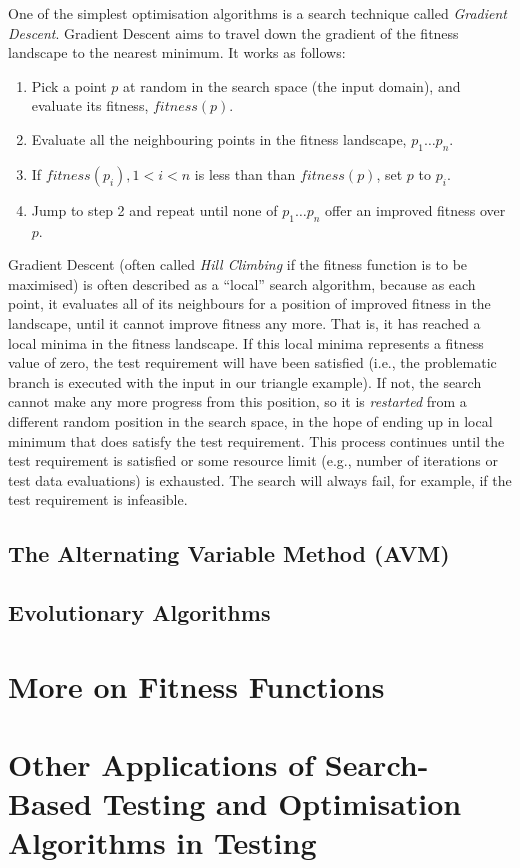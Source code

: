 One of the simplest optimisation algorithms is a search technique called {\it
Gradient Descent}. Gradient Descent aims to travel down the gradient of the
fitness landscape to the nearest minimum. It works as follows:

\begin{enumerate}

\item Pick a point $p$ at random in the search space (the input domain), and evaluate
its fitness, $\mathit{fitness}(p)$.
\item Evaluate all the neighbouring points in the fitness landscape, $p_1 \dots p_n$.
\item If $\mathit{fitness}(p_i), 1 < i < n$ is less than than
$\mathit{fitness}(p)$, set $p$ to $p_i$.
\item Jump to step 2 and repeat until none of $p_1 \dots p_n$ offer an improved
fitness over $p$.

\end{enumerate}

Gradient Descent (often called {\it Hill Climbing} if the fitness function is to
be maximised) is often described as a ``local'' search algorithm, because as
each point, it evaluates all of its neighbours for a position of improved
fitness in the landscape, until it cannot improve fitness any more. That is, it
has reached a local minima in the fitness landscape. If this local minima
represents a fitness value of zero, the test requirement will have been
satisfied (i.e., the problematic branch is executed with the input in our
triangle example). If not, the search cannot make any more progress from this
position, so it is {\it restarted} from a different random position in the
search space, in the hope of ending up in local minimum that does satisfy the
test requirement. This process continues until the test requirement is satisfied
or some resource limit (e.g., number of iterations or test data evaluations) is
exhausted. The search will always fail, for example, if the test requirement is
infeasible. 

\subsection{The Alternating Variable Method (AVM)}


\subsection{Evolutionary Algorithms}



\section{More on Fitness Functions}



\section{Other Applications of Search-Based Testing and Optimisation Algorithms in Testing}




